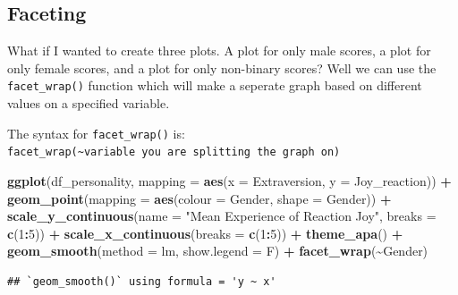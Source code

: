\documentclass[
]{book}
\newenvironment{Shaded}{\begin{snugshade}}{\end{snugshade}}
\newcommand{\AttributeTok}[1]{\textcolor[rgb]{0.13,0.29,0.53}{#1}}
\newcommand{\DecValTok}[1]{\textcolor[rgb]{0.00,0.00,0.81}{#1}}
\newcommand{\FunctionTok}[1]{\textcolor[rgb]{0.13,0.29,0.53}{\textbf{#1}}}
\newcommand{\NormalTok}[1]{#1}
\newcommand{\SpecialCharTok}[1]{\textcolor[rgb]{0.81,0.36,0.00}{\textbf{#1}}}
\newcommand{\StringTok}[1]{\textcolor[rgb]{0.31,0.60,0.02}{#1}}
\begin{document}
\hypertarget{faceting}{%
\subsection{Faceting}\label{faceting}}

What if I wanted to create three plots. A plot for only male scores, a plot for only female scores, and a plot for only non-binary scores? Well we can use the \texttt{facet\_wrap()} function which will make a seperate graph based on different values on a specified variable.

The syntax for \texttt{facet\_wrap()} is: \texttt{facet\_wrap(\textasciitilde{}variable\ you\ are\ splitting\ the\ graph\ on)}

\begin{Shaded}
\begin{Highlighting}[]
\FunctionTok{ggplot}\NormalTok{(df\_personality, }\AttributeTok{mapping =} \FunctionTok{aes}\NormalTok{(}\AttributeTok{x =}\NormalTok{ Extraversion, }\AttributeTok{y =}\NormalTok{ Joy\_reaction)) }\SpecialCharTok{+}
  \FunctionTok{geom\_point}\NormalTok{(}\AttributeTok{mapping =} \FunctionTok{aes}\NormalTok{(}\AttributeTok{colour =}\NormalTok{ Gender, }\AttributeTok{shape =}\NormalTok{ Gender)) }\SpecialCharTok{+}
  \FunctionTok{scale\_y\_continuous}\NormalTok{(}\AttributeTok{name =} \StringTok{"Mean Experience of Reaction Joy"}\NormalTok{, }\AttributeTok{breaks =} \FunctionTok{c}\NormalTok{(}\DecValTok{1}\SpecialCharTok{:}\DecValTok{5}\NormalTok{)) }\SpecialCharTok{+}
  \FunctionTok{scale\_x\_continuous}\NormalTok{(}\AttributeTok{breaks =} \FunctionTok{c}\NormalTok{(}\DecValTok{1}\SpecialCharTok{:}\DecValTok{5}\NormalTok{)) }\SpecialCharTok{+}
  \FunctionTok{theme\_apa}\NormalTok{() }\SpecialCharTok{+}
  \FunctionTok{geom\_smooth}\NormalTok{(}\AttributeTok{method =}\NormalTok{ lm, }\AttributeTok{show.legend =}\NormalTok{ F) }\SpecialCharTok{+}
  \FunctionTok{facet\_wrap}\NormalTok{(}\SpecialCharTok{\textasciitilde{}}\NormalTok{Gender)}
\end{Highlighting}
\end{Shaded}

\begin{verbatim}
## `geom_smooth()` using formula = 'y ~ x'
\end{verbatim}
\end{document}
